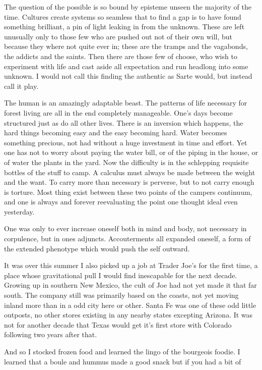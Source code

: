 \documentclass[ebook, 10pt, openright, onecolumn]{memoir}
\newcommand*\td[1]{
  \todo[inline]{
     #1 
  }
}
\newcommand*\finish{\td{ ----- Finish this section -----}}
\begin{document}
The question of the possible is so bound by episteme unseen the majority of the
time.  Cultures create systems so seamless that to find a gap is to have found
something brilliant, a pin of light leaking in from the unknown.  These are left
unusually only to those few who are pushed out not of their own will, but
because they where not quite ever in; these are the tramps and the vagabonds,
the addicts and the saints.  Then there are those few of choose, who wish to
experiment with life and cast aside all expectation and run headlong into some
unknown.  I would not call this finding the authentic as Sarte would, but
instead call it play.

The human is an amazingly adaptable beast.  The patterns of life necessary for
forest living are all in the end completely manageable.  One's days become
structured just as do all other lives.  There is an inversion which happens, the
hard things becoming easy and the easy becoming hard.  Water becomes something
precious, not had without a huge investment in time and effort.  Yet one has not
to worry about paying the water bill, or of the piping in the house, or of water
the plants in the yard.  Now the difficulty is in the schlepping requisite
bottles of the stuff to camp.  A calculus must always be made between the weight
and the want.  To carry more than necessary is perverse, but to not carry enough
is torture.  Most thing exist between these two points of the campers continuum,
and one is always and forever reevaluating the point one thought ideal even
yesterday.

\finish


One was only to ever increase oneself both in mind and body, not
necessary in corpulence, but in ones adjuncts.  Accouterments all expanded
oneself, a form of the extended phenotype which would push the self outward.


It was over this summer I also picked up a job at Trader Joe's for the first
time, a place whose gravitational pull I would find inescapable for the next
decade.  Growing up in southern New Mexico, the cult of Joe had not yet made it
that far south.  The company still was primarily based on the coasts, not yet
moving inland more than in a odd city here or other. Santa Fe was one of these
odd little outposts, no other stores existing in any nearby states excepting
Arizona.  It was not for another decade that Texas  would get it's first
store with Colorado following two years after that.

\finish

And so I stocked frozen food and learned the lingo of the bourgeois foodie. I
learned that a boule and hummus made a good snack but if you had a bit of
\end{document}
